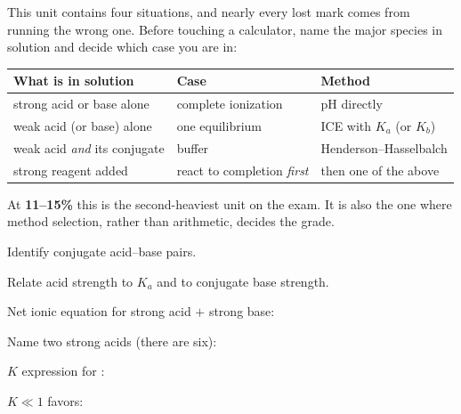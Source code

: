\documentclass{apchem-notes}
\begin{document}
\apctitleblock

\begin{apcnote}
This unit contains four situations, and nearly every lost mark comes from
running the wrong one. Before touching a calculator, name the major species
in solution and decide which case you are in:

\begin{center}
\renewcommand{\arraystretch}{1.2}
\begin{tabular}{@{}lll@{}}
\hline
\textbf{What is in solution} & \textbf{Case} & \textbf{Method} \\
\hline
strong acid or base alone & complete ionization & pH directly \\
weak acid (or base) alone & one equilibrium & ICE with $K_a$ (or $K_b$) \\
weak acid \emph{and} its conjugate & buffer &
  Henderson--Hasselbalch \\
strong reagent added & react to completion \emph{first} & then one of the
  above \\
\hline
\end{tabular}
\end{center}

At \textbf{11--15\%} this is the second-heaviest unit on the exam. It is
also the one where method selection, rather than arithmetic, decides the
grade.
\end{apcnote}


\begin{objectives}
  \item Identify conjugate acid--base pairs.
  \item Relate acid strength to $K_a$ and to conjugate base strength.
\end{objectives}


\begin{warmup}[4]
  \item Net ionic equation for strong acid $+$ strong base:
  \item Name two strong acids (there are six):
  \item $K$ expression for :
        \answerblank[4.2cm]{$[\ce{H+}][\ce{A^-}]/[\ce{HA}]$}
  \item $K \ll 1$ favors: 
\end{warmup}
\end{document}
